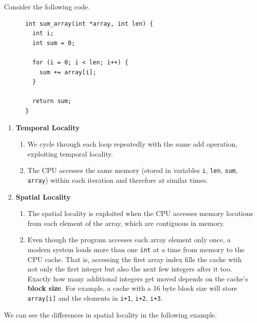   \begin{example}[Locality]
    Consider the following code. 
    \begin{lstlisting}
      int sum_array(int *array, int len) {
        int i;
        int sum = 0;

        for (i = 0; i < len; i++) {
          sum += array[i];
        }

        return sum;
      }
    \end{lstlisting}
    \begin{enumerate}
      \item \textbf{Temporal Locality}
        \begin{enumerate}
          \item We cycle through each loop repeatedly with the same add operation, exploiting temporal locality.  
          \item The CPU accesses the same memory (stored in variables \texttt{i}, \texttt{len}, \texttt{sum}, \texttt{array}) within each iteration and therefore at similar times. 
        \end{enumerate}
      \item \textbf{Spatial Locality}
        \begin{enumerate}
          \item The spatial locality is exploited when the CPU accesses memory locations from each element of the array, which are contiguous in memory. 
          \item Even though the program accesses each array element only once, a modern system loads more than one \texttt{int} at a time from memory to the CPU cache. That is, accessing the first array index fills the cache with not only the first integer but also the next few integers after it too. Exactly how many additional integers get moved depends on the cache's \textbf{block size}. For example, a cache with a 16 byte block size will store \texttt{array[i]} and the elements in \texttt{i+1}, \texttt{i+2}, \texttt{i+3}. 
        \end{enumerate}
    \end{enumerate}
  \end{example}

  We can see the differences in spatial locality in the following example. 

